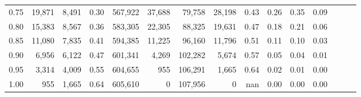 \begin{tabular}{rrrrrrrrrrrrrrr}
0.75 &  19,871 &  8,491 &  0.30 &  567,922 &   37,688 &   79,758 &   28,198 &  0.43 &  0.26 &  0.35 &      0.09 \\
0.80 &  15,383 &  8,567 &  0.36 &  583,305 &   22,305 &   88,325 &   19,631 &  0.47 &  0.18 &  0.21 &      0.06 \\
0.85 &  11,080 &  7,835 &  0.41 &  594,385 &   11,225 &   96,160 &   11,796 &  0.51 &  0.11 &  0.10 &      0.03 \\
0.90 &   6,956 &  6,122 &  0.47 &  601,341 &    4,269 &  102,282 &    5,674 &  0.57 &  0.05 &  0.04 &      0.01 \\
0.95 &   3,314 &  4,009 &  0.55 &  604,655 &      955 &  106,291 &    1,665 &  0.64 &  0.02 &  0.01 &      0.00 \\
1.00 &     955 &  1,665 &  0.64 &  605,610 &        0 &  107,956 &        0 &   nan &  0.00 &  0.00 &      0.00 \\
\bottomrule
\end{tabular}

